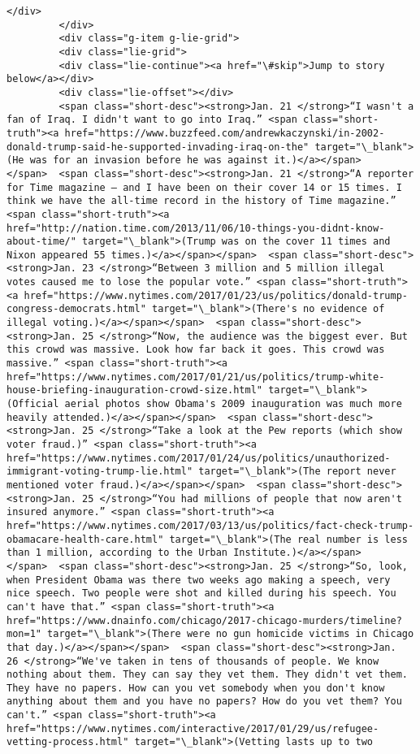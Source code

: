 \documentclass[11pt]{article}
\begin{document}
\begin{Verbatim}[commandchars=\\\{\}]
         </div>
         </div>
         <div class="g-item g-lie-grid">
         <div class="lie-grid">
         <div class="lie-continue"><a href="\#skip">Jump to story below</a></div>
         <div class="lie-offset"></div>
         <span class="short-desc"><strong>Jan. 21 </strong>“I wasn't a fan of Iraq. I didn't want to go into Iraq.” <span class="short-truth"><a href="https://www.buzzfeed.com/andrewkaczynski/in-2002-donald-trump-said-he-supported-invading-iraq-on-the" target="\_blank">(He was for an invasion before he was against it.)</a></span></span>  <span class="short-desc"><strong>Jan. 21 </strong>“A reporter for Time magazine — and I have been on their cover 14 or 15 times. I think we have the all-time record in the history of Time magazine.” <span class="short-truth"><a href="http://nation.time.com/2013/11/06/10-things-you-didnt-know-about-time/" target="\_blank">(Trump was on the cover 11 times and Nixon appeared 55 times.)</a></span></span>  <span class="short-desc"><strong>Jan. 23 </strong>“Between 3 million and 5 million illegal votes caused me to lose the popular vote.” <span class="short-truth"><a href="https://www.nytimes.com/2017/01/23/us/politics/donald-trump-congress-democrats.html" target="\_blank">(There's no evidence of illegal voting.)</a></span></span>  <span class="short-desc"><strong>Jan. 25 </strong>“Now, the audience was the biggest ever. But this crowd was massive. Look how far back it goes. This crowd was massive.” <span class="short-truth"><a href="https://www.nytimes.com/2017/01/21/us/politics/trump-white-house-briefing-inauguration-crowd-size.html" target="\_blank">(Official aerial photos show Obama's 2009 inauguration was much more heavily attended.)</a></span></span>  <span class="short-desc"><strong>Jan. 25 </strong>“Take a look at the Pew reports (which show voter fraud.)” <span class="short-truth"><a href="https://www.nytimes.com/2017/01/24/us/politics/unauthorized-immigrant-voting-trump-lie.html" target="\_blank">(The report never mentioned voter fraud.)</a></span></span>  <span class="short-desc"><strong>Jan. 25 </strong>“You had millions of people that now aren't insured anymore.” <span class="short-truth"><a href="https://www.nytimes.com/2017/03/13/us/politics/fact-check-trump-obamacare-health-care.html" target="\_blank">(The real number is less than 1 million, according to the Urban Institute.)</a></span></span>  <span class="short-desc"><strong>Jan. 25 </strong>“So, look, when President Obama was there two weeks ago making a speech, very nice speech. Two people were shot and killed during his speech. You can't have that.” <span class="short-truth"><a href="https://www.dnainfo.com/chicago/2017-chicago-murders/timeline?mon=1" target="\_blank">(There were no gun homicide victims in Chicago that day.)</a></span></span>  <span class="short-desc"><strong>Jan. 26 </strong>“We've taken in tens of thousands of people. We know nothing about them. They can say they vet them. They didn't vet them. They have no papers. How can you vet somebody when you don't know anything about them and you have no papers? How do you vet them? You can't.” <span class="short-truth"><a href="https://www.nytimes.com/interactive/2017/01/29/us/refugee-vetting-process.html" target="\_blank">(Vetting lasts up to two 
\end{Verbatim}
\end{document}
